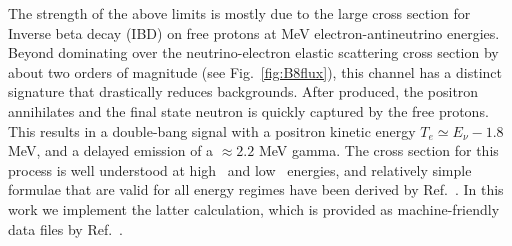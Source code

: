 \documentclass[
reprint,
superscriptaddress,
showpacs,
preprintnumbers,
nofootinbib,
nobibnotes,
amsmath,
amssymb, 
aps,
prd,
floatfix
]{revtex4-1}
\newcommand{\reffig}[1]{Fig.~\ref{#1}}
\begin{document}
The strength of the above limits is mostly due to the large cross section for Inverse beta decay (IBD) on free protons at MeV electron-antineutrino energies. Beyond dominating over the neutrino-electron elastic scattering cross section by about two orders of magnitude (see \reffig{fig:B8flux}), this channel has a distinct signature that drastically reduces backgrounds. After produced, the positron annihilates and the final state neutron is quickly captured by the free protons. This results in a double-bang signal with a positron kinetic energy $T_e \simeq E_\nu - 1.8$ MeV, and a delayed emission of a $\approx 2.2$ MeV gamma. The cross section for this process is well understood at high~\cite{LlewellynSmith:1971uhs} and low~\cite{Vogel:1999zy} energies, and relatively simple formulae that are valid for all energy regimes have been derived by Ref.~\cite{Strumia:2003zx}. In this work we implement the latter calculation, which is provided as machine-friendly data files by Ref.~\cite{Ankowski:2016oyj}.
\end{document}
